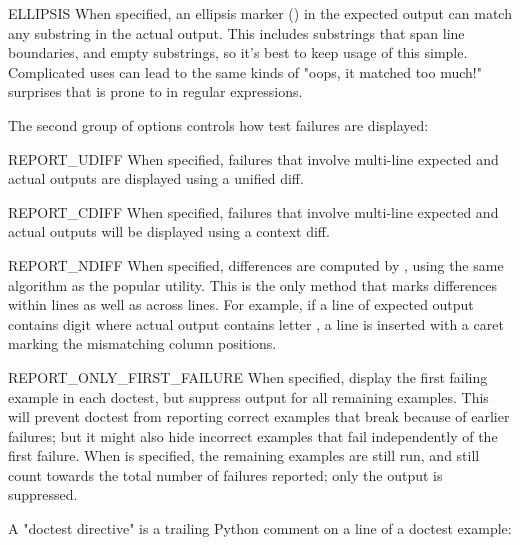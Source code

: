 \begin{datadesc}{ELLIPSIS}
    When specified, an ellipsis marker () in the expected output
    can match any substring in the actual output.  This includes
    substrings that span line boundaries, and empty substrings, so it's
    best to keep usage of this simple.  Complicated uses can lead to the
    same kinds of "oops, it matched too much!" surprises that 
    is prone to in regular expressions.
\end{datadesc}

The second group of options controls how test failures are displayed:

\begin{datadesc}{REPORT_UDIFF}
    When specified, failures that involve multi-line expected and
    actual outputs are displayed using a unified diff.
\end{datadesc}

\begin{datadesc}{REPORT_CDIFF}
    When specified, failures that involve multi-line expected and
    actual outputs will be displayed using a context diff.
\end{datadesc}

\begin{datadesc}{REPORT_NDIFF}
    When specified, differences are computed by ,
    using the same algorithm as the popular  utility.
    This is the only method that marks differences within lines as
    well as across lines.  For example, if a line of expected output
    contains digit  where actual output contains letter ,
    a line is inserted with a caret marking the mismatching column
    positions.
\end{datadesc}

\begin{datadesc}{REPORT_ONLY_FIRST_FAILURE}
  When specified, display the first failing example in each doctest,
  but suppress output for all remaining examples.  This will prevent
  doctest from reporting correct examples that break because of
  earlier failures; but it might also hide incorrect examples that
  fail independently of the first failure.  When
   is specified, the remaining
  examples are still run, and still count towards the total number of
  failures reported; only the output is suppressed.
\end{datadesc}

A "doctest directive" is a trailing Python comment on a line of a doctest
example:

